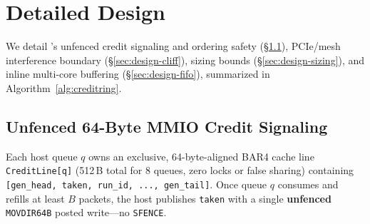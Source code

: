 \section{Detailed Design}
\label{sec:design}

We detail \sys{}'s unfenced credit signaling and ordering safety
(\S\ref{sec:design-signaling}), PCIe/mesh interference boundary
(\S\ref{sec:design-cliff}), sizing bounds (\S\ref{sec:design-sizing}), and
inline multi-core buffering (\S\ref{sec:design-fifo}), summarized in
Algorithm~\ref{alg:creditring}.

\subsection{Unfenced 64-Byte MMIO Credit Signaling}
\label{sec:design-signaling}

Each host queue $q$ owns an exclusive, 64-byte-aligned BAR4 cache line
\texttt{CreditLine[q]} (512\,B total for 8 queues, zero locks or false sharing)
containing \texttt{[gen\_head, taken, run\_id, ..., gen\_tail]}. Once queue $q$
consumes and refills at least $B$ packets, the host publishes \texttt{taken}
with a single \textbf{unfenced} \texttt{MOVDIR64B} posted write---no
\texttt{SFENCE}.

